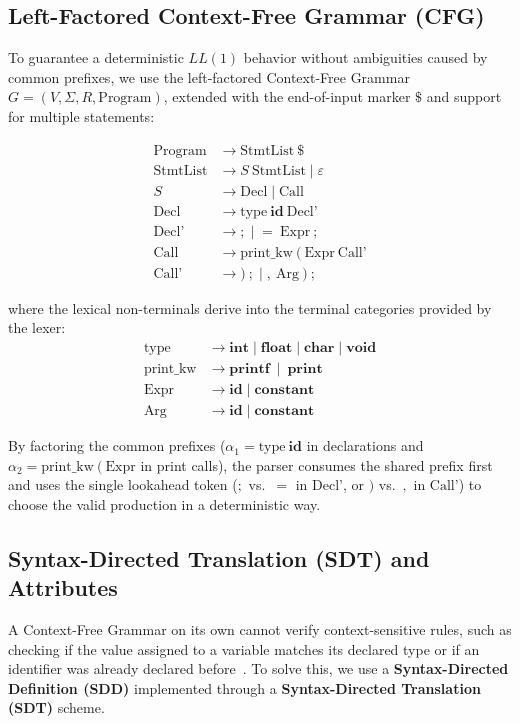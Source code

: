 \documentclass[letterpaper,12pt,oneside]{article}
\begin{document}
\subsection{Left-Factored Context-Free Grammar (CFG)}
To guarantee a deterministic $LL(1)$ behavior without ambiguities caused by common prefixes, we use the left-factored Context-Free Grammar $G = (V, \Sigma, R, \text{Program})$, extended with the end-of-input marker $\$ $ and support for multiple statements:

\begin{align}
    \text{Program} &\to \text{StmtList} \ \$ \\
    \text{StmtList} &\to S \ \text{StmtList} \mid \varepsilon \\
    S &\to \text{Decl} \mid \text{Call} \\
    \text{Decl} &\to \text{type} \ \mathbf{id} \ \text{Decl'} \\
    \text{Decl'} &\to \mathbf{;} \;\Big|\; \mathbf{=} \ \text{Expr} \ \mathbf{;} \\
    \text{Call} &\to \text{print\_kw} \ \mathbf{(} \ \text{Expr} \ \text{Call'} \\
    \text{Call'} &\to \mathbf{)} \ \mathbf{;} \;\Big|\; \mathbf{,} \ \text{Arg} \ \mathbf{)} \ \mathbf{;}
\end{align}

where the lexical non-terminals derive into the terminal categories provided by the lexer:
\begin{align}
    \text{type} &\to \mathbf{int} \mid \mathbf{float} \mid \mathbf{char} \mid \mathbf{void} \\
    \text{print\_kw} &\to \mathbf{printf} \ \mid \ \mathbf{print} \\
    \text{Expr} &\to \mathbf{id} \mid \mathbf{constant} \\
    \text{Arg} &\to \mathbf{id} \mid \mathbf{constant}
\end{align}

By factoring the common prefixes ($\alpha_1 = \text{type} \ \mathbf{id}$ in declarations and $\alpha_2 = \text{print\_kw} \ \mathbf{(} \ \text{Expr}$ in print calls), the parser consumes the shared prefix first and uses the single lookahead token ($\mathbf{;}$ vs.\ $\mathbf{=}$ in $\text{Decl'}$, or $\mathbf{)}$ vs.\ $\mathbf{,}$ in $\text{Call'}$) to choose the valid production in a deterministic way.

\subsection{Syntax-Directed Translation (SDT) and Attributes}
A Context-Free Grammar on its own cannot verify context-sensitive rules, such as checking if the value assigned to a variable matches its declared type or if an identifier was already declared before~\cite{10.5555/576122}. To solve this, we use a \textbf{Syntax-Directed Definition (SDD)} implemented through a \textbf{Syntax-Directed Translation (SDT)} scheme.
\end{document}

